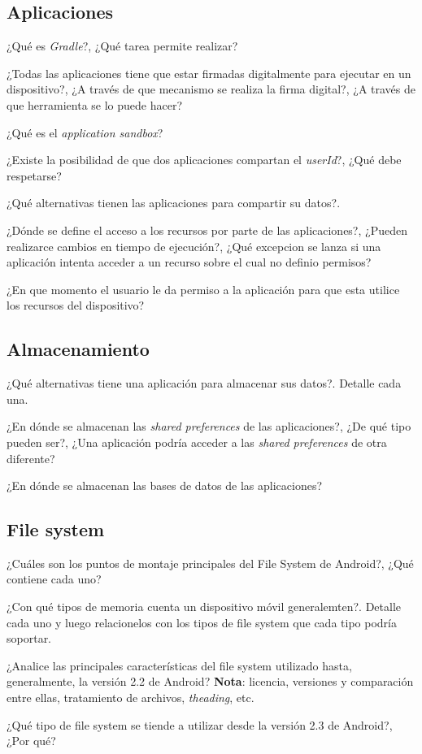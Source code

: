 \subsection{Aplicaciones}
\begin{questions}
  \question ¿Qué es \textit{Gradle}?, ¿Qué tarea permite realizar?
  
  \question ¿Todas las aplicaciones tiene que estar firmadas digitalmente para ejecutar en un dispositivo?, ¿A través de que mecanismo se realiza la firma digital?, ¿A través de que herramienta se lo puede hacer?
  
  \question ¿Qué es el \textit{application sandbox}?
  
  \question ¿Existe la posibilidad de que dos aplicaciones compartan el \textit{userId}?, ¿Qué debe respetarse?
  
  \question ¿Qué alternativas tienen las aplicaciones para compartir su datos?.
  
  \question ¿Dónde se define el acceso a los recursos por parte de las aplicaciones?, ¿Pueden realizarce cambios en tiempo de ejecución?, ¿Qué excepcion se lanza si una aplicación intenta acceder a un recurso sobre el cual no definio permisos?
  
  \question ¿En que momento el usuario le da permiso a la aplicación para que esta utilice los recursos del dispositivo?
\end{questions}

\subsection{Almacenamiento}
\begin{questions}
  \question ¿Qué alternativas tiene una aplicación para almacenar sus datos?. Detalle cada una.

  \question ¿En dónde se almacenan las \textit{shared preferences} de las aplicaciones?, ¿De qué tipo pueden ser?, ¿Una aplicación podría acceder a las \textit{shared preferences} de otra diferente?
  
  \question ¿En dónde se almacenan las bases de datos de las aplicaciones?
\end{questions}

\subsection{File system}
\begin{questions}
  \question ¿Cuáles son los puntos de montaje principales del File System de Android?, ¿Qué contiene cada uno?

  \question ¿Con qué tipos de memoria cuenta un dispositivo móvil generalemten?. Detalle cada uno y luego relacionelos con los tipos de file system que cada tipo podría soportar.
  
  \question ¿Analice las principales características del file system utilizado hasta, generalmente, la versión 2.2 de Android? \textbf{Nota}: licencia, versiones y comparación entre ellas, tratamiento de archivos, \textit{theading}, etc.
  
  \question ¿Qué tipo de file system se tiende a utilizar desde la versión 2.3 de Android?, ¿Por qué?
\end{questions}

